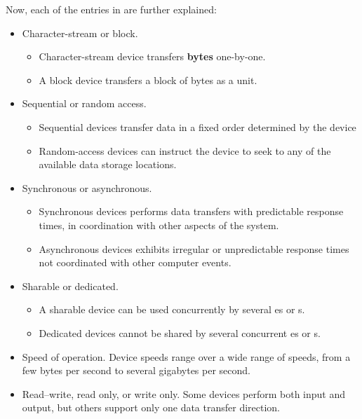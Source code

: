 Now, each of the entries in  are further explained:
\begin{itemize}[noitemsep]
\item Character-stream or block.
  \begin{itemize}[noitemsep]
  \item Character-stream device transfers \textbf{bytes} one-by-one.
  \item A block device transfers a block of bytes as a unit.
\end{itemize}

\item Sequential or random access.
  \begin{itemize}[noitemsep]
  \item Sequential devices transfer data in a fixed order determined by the device
  \item Random-access devices can instruct the device to seek to any of the available data storage locations.
\end{itemize}

\item Synchronous or asynchronous.
  \begin{itemize}[noitemsep]
  \item Synchronous devices performs data transfers with predictable response times, in coordination with other aspects of the system.
  \item Asynchronous devices exhibits irregular or unpredictable response times not coordinated with other computer events.
\end{itemize}

\item Sharable or dedicated.
  \begin{itemize}[noitemsep]
  \item A sharable device can be used concurrently by several es or s.
  \item Dedicated devices cannot be shared by several concurrent es or s.
\end{itemize}

\item Speed of operation.
  Device speeds range over a wide range of speeds, from a few bytes per second to several gigabytes per second.

\item Read–write, read only, or write only.
  Some devices perform both input and output, but others support only one data transfer direction.
\end{itemize}

